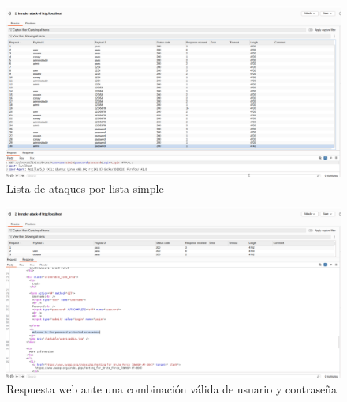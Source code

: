 \documentclass[letterpaper,12pt]{article}
\begin{document}
\begin{figure}
    \centering
    \includegraphics[width=1\linewidth]{identificaryobtenercamposburp/Captura desde 2025-10-01 23-26-54.png}
    \caption{Lista de ataques por lista simple}
    \label{fig:ataqueslistasimple}
\end{figure}
\begin{figure}
    \centering
    \includegraphics[width=1\linewidth]{identificaryobtenercamposburp/Captura desde 2025-10-01 23-27-12.png}
    \caption{Respuesta web ante una combinación válida de usuario y contraseña}
    \label{fig:intrudersuccesfulattack}
\end{figure}
\end{document}
